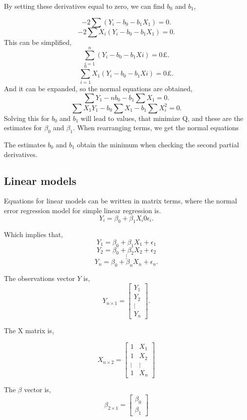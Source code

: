 \noindent By setting these derivatives equal to zero, we can find $b_0$ and $b_1$, 

$$-2 \sum (Y_i - b_0 - b_1 X_1)=0 .$$
$$-2\sum X_i(Y_i - b_0 - b_1 X_1)=0 .$$
This can be simplified, 
$$\sum_{i=1}^{n} (Y_i - b_0 - b_1 Xi)=0£ .$$
$$\sum_{i=1}^{n} X_1(Y_i - b_0 - b_1 Xi)=0£ .$$
And it can be expanded, so the normal equations are obtained, 
$$\sum Y_1 - n b_0 - b_1 \sum X_1 =0 .$$
$$\sum X_1 Y_1  - b_0 \sum X_1 - b_1 \sum X_i^2 =0 .$$
Solving this for $b_0$ and $b_1$ will lead to values, that minimize Q, and these are the estimates for $\beta_0$ and $\beta_1$. 
When rearranging terms, we get the normal equations %

\noindent The estimates $b_0$ and $b_1$ obtain the minimum when checking the second partial derivatives. \newline


\subsection{Linear models}

Equations for linear models can be written in matrix terms, where the normal error regression model for simple linear regression is.
$$Y_i = \beta_0 + \beta_1 X_i 0 \epsilon_i .$$ 


\noindent Which implies that,
$$Y_1 = \beta_0 + \beta_1 X_1 + \epsilon_1$$
$$Y_2 = \beta_0 + \beta_2 X_2 + \epsilon_2$$
$$\vdots$$
$$Y_n = \beta_0 + \beta_n X_n + \epsilon_n .$$

\noindent The observations vector $Y$ is,
$$ Y_{n \times 1} =
\left[
\begin{array}{c}
	Y_1 \\ 
	Y_2 \\ 
	\vdots \\
	Y_n 
\end{array}
\right].
$$	

\noindent The X matrix is, 

$$X_{n \times 2}=
\left[
\begin{array}{cc}
	1 & X_1 \\ 
	1 & X_2 \\ 
	\vdots & \vdots \\
	1 & X_n
\end{array}
\right]
$$


\noindent The $\beta$ vector is, 
$$ \beta_{2 \times 1} =
\left[
\begin{array}{c}
	\beta_0 \\ 
	\beta_1 
\end{array}
\right]
$$

